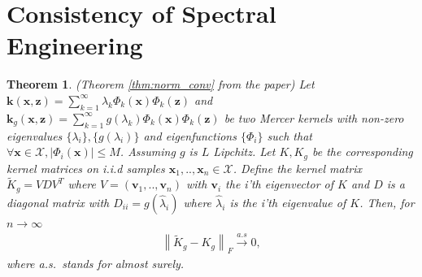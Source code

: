 \documentclass[10pt]{article} %
\theoremstyle{plain}
\newtheorem{theorem}{Theorem}[section]
\theoremstyle{definition}
\theoremstyle{remark}
\newcommand{\norm}[1]{\left\lVert#1\right\rVert}
\newcommand{\abs}[1]{\left|#1\right|}
\newcommand{\vv}{\mathbf{v}}
\newcommand{\x}{\mathbf{x}}
\newcommand{\z}{\mathbf{z}}
\newcommand{\kr}{\boldsymbol{k}}
\begin{document}
\section{Consistency of Spectral Engineering}\label{appendix:engineering}
\begin{theorem}(Theorem \ref{thm:norm_conv} from the paper)
Let $\kr(\x,\z)=\sum_{k=1}^\infty \lambda_k\Phi_k(\x)\Phi_k(\z)$ and $\kr_g(\x,\z)=\sum_{k=1}^\infty g(\lambda_k)\Phi_k(\x)\Phi_k(\z)$ be two Mercer kernels with non-zero eigenvalues $\{\lambda_i\},\{g(\lambda_i)\}$ and eigenfunctions $\{\Phi_i\}$ such that $\forall \x\in \mathcal X,\abs{\Phi_i(\x)}\leq M$. Assuming $g$ is $L$ Lipchitz. Let $K,K_g$ be the corresponding kernel matrices on i.i.d samples $\x_1,..,\x_n\in \mathcal X$. Define the kernel matrix $\tilde K_g=V  D V^T$ where $V=(\vv_1,..,\vv_n)$ with $\vv_i$ the i'th eigenvector of $K$ and $ D$ is a diagonal matrix with $ D_{ii}=g(\hat \lambda_i)$ where $\hat \lambda_i$ is the i'th eigenvalue of $K$. Then, for $n\rightarrow \infty $
\begin{align*}
\norm{\tilde K_g-K_g}_F\overset{a.s}{\rightarrow} 0,
\end{align*}
where a.s.\ stands for almost surely.
\end{theorem}
\end{document}
